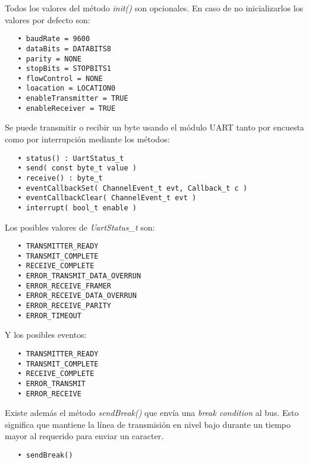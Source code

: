Todos los valores del método \emph{init()} son opcionales. En caso de no inicializarlos los valores por defecto son:

\begin{verbatim}
   • baudRate = 9600
   • dataBits = DATABITS8
   • parity = NONE
   • stopBits = STOPBITS1
   • flowControl = NONE
   • loacation = LOCATION0
   • enableTransmitter = TRUE
   • enableReceiver = TRUE
\end{verbatim}

Se puede transmitir o recibir un byte usando el módulo UART tanto por encuesta como por interrupción mediante los métodos:

\begin{verbatim}
   • status() : UartStatus_t
   • send( const byte_t value )
   • receive() : byte_t
   • eventCallbackSet( ChannelEvent_t evt, Callback_t c )
   • eventCallbackClear( ChannelEvent_t evt )
   • interrupt( bool_t enable )
\end{verbatim}
  
Los posibles valores de \emph{UartStatus\_t} son:


\begin{verbatim}
   • TRANSMITTER_READY
   • TRANSMIT_COMPLETE
   • RECEIVE_COMPLETE
   • ERROR_TRANSMIT_DATA_OVERRUN
   • ERROR_RECEIVE_FRAMER
   • ERROR_RECEIVE_DATA_OVERRUN
   • ERROR_RECEIVE_PARITY
   • ERROR_TIMEOUT
\end{verbatim}

Y los posibles eventos:


\begin{verbatim}
   • TRANSMITTER_READY
   • TRANSMIT_COMPLETE
   • RECEIVE_COMPLETE
   • ERROR_TRANSMIT
   • ERROR_RECEIVE
\end{verbatim}

Existe además el método \emph{sendBreak()} que envía una \emph{break condition} al bus. Esto significa que mantiene la línea de transmisión en nivel bajo durante un tiempo mayor al requerido para enviar un caracter.

\begin{verbatim}
   • sendBreak()
\end{verbatim}

